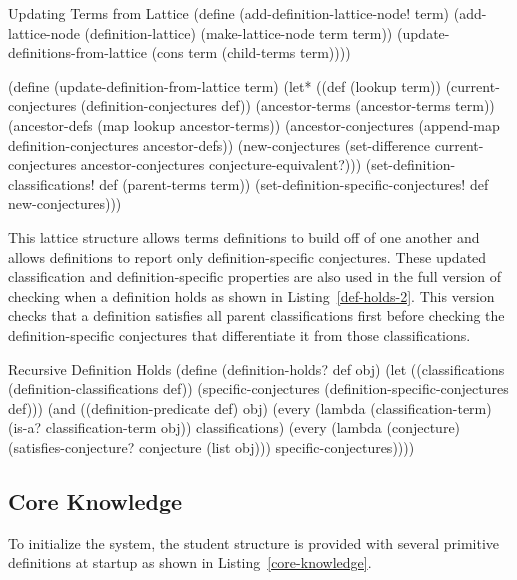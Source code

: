 \begin{code-listing}
[label=updating-terms]
{Updating Terms from Lattice}
(define (add-definition-lattice-node! term)
  (add-lattice-node (definition-lattice) (make-lattice-node term term))
  (update-definitions-from-lattice (cons term (child-terms term))))

(define (update-definition-from-lattice term)
  (let* ((def (lookup term))
         (current-conjectures (definition-conjectures def))
         (ancestor-terms (ancestor-terms term))
         (ancestor-defs (map lookup ancestor-terms))
         (ancestor-conjectures
          (append-map definition-conjectures ancestor-defs))
         (new-conjectures
          (set-difference current-conjectures
                          ancestor-conjectures
                          conjecture-equivalent?)))
    (set-definition-classifications! def (parent-terms term))
    (set-definition-specific-conjectures! def new-conjectures)))
\end{code-listing}

This lattice structure allows terms definitions to build off of one
another and allows definitions to report only definition-specific
conjectures. These updated classification and definition-specific
properties are also used in the full version of checking when a
definition holds as shown in Listing~\ref{def-holds-2}. This version
checks that a definition satisfies all parent classifications first
before checking the definition-specific conjectures that differentiate
it from those classifications.

\begin{code-listing}
[label=def-holds-2]
{Recursive Definition Holds}
(define (definition-holds? def obj)
  (let ((classifications (definition-classifications def))
        (specific-conjectures (definition-specific-conjectures def)))
    (and ((definition-predicate def) obj)
         (every (lambda (classification-term)
                  (is-a? classification-term obj))
                classifications)
         (every (lambda (conjecture)
                  (satisfies-conjecture? conjecture (list obj)))
                specific-conjectures))))
\end{code-listing}

\subsection{Core Knowledge}

To initialize the system, the student structure is provided with
several primitive definitions at startup as shown in
Listing~\ref{core-knowledge}.

